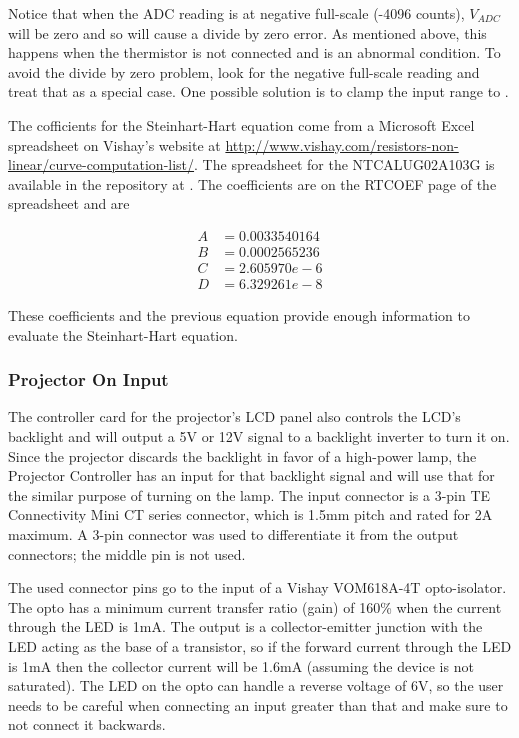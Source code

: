 \documentclass{article}
\begin{document}
Notice that when the ADC reading is at negative full-scale (-4096 counts), $V_{ADC}$ will be zero
and so will cause a divide by zero error.  As mentioned above, this happens when the thermistor is
not connected and is an abnormal condition.  To avoid the divide by zero problem, look for the
negative full-scale reading and treat that as a special case.  One possible solution is to clamp the
input range to .

The cofficients for the Steinhart-Hart equation come from a Microsoft Excel spreadsheet on Vishay's
website at \url{http://www.vishay.com/resistors-non-linear/curve-computation-list/}.  The
spreadsheet for the NTCALUG02A103G is available in the repository at
.  The coefficients are on the RTCOEF page of the
spreadsheet and are

\begin{align*}
    A &= 0.0033540164 \\
    B &= 0.0002565236 \\
    C &= 2.605970e-6 \\
    D &= 6.329261e-8
\end{align*}

These coefficients and the previous equation provide enough information to evaluate the
Steinhart-Hart equation.

\subsubsection{Projector On Input} \label{sssec:PJOnInput}
The controller card for the projector's LCD panel also controls the LCD's backlight and will output
a 5V or 12V signal to a backlight inverter to turn it on.  Since the projector discards the
backlight in favor of a high-power lamp, the Projector Controller has an input for that backlight
signal and will use that for the similar purpose of turning on the lamp.  The input connector is a
3-pin TE Connectivity Mini CT series connector, which is 1.5mm pitch and rated for 2A maximum.  A
3-pin connector was used to differentiate it from the output connectors; the middle pin is not used.

The used connector pins go to the input of a Vishay VOM618A-4T opto-isolator. The opto has a minimum
current transfer ratio (gain) of 160\% when the current through the LED is 1mA.  The output is a
collector-emitter junction with the LED acting as the base of a transistor, so if the forward
current through the LED is 1mA then the collector current will be 1.6mA (assuming the device is not
saturated).  The LED on the opto can handle a reverse voltage of 6V, so the user needs to be careful
when connecting an input greater than that and make sure to not connect it backwards.
\end{document}
